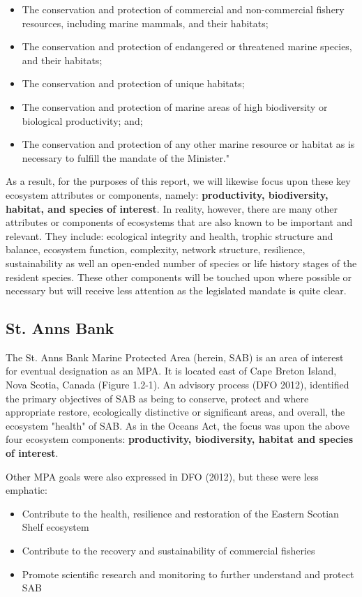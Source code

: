 \documentclass[letterpaper,portrait,11pt]{scrartcl}
\numberwithin{equation}{section}		%
\numberwithin{figure}{section}			%
\numberwithin{table}{section}				%
\begin{document}
\begin{itemize}
  \item The conservation and protection of commercial and non-commercial fishery resources, including marine mammals, and their habitats; 
  \item The conservation and protection of endangered or threatened marine species, and their habitats; 
  \item The conservation and protection of unique habitats; 
  \item The conservation and protection of marine areas of high biodiversity or biological productivity; and; 
  \item The conservation and protection of any other marine resource or habitat as is necessary to fulfill the mandate of the Minister."
\end{itemize}

As a result, for the purposes of this report, we will likewise focus upon these key ecosystem attributes or components, namely: \textbf{productivity, biodiversity, habitat, and  species of interest}. In reality, however, there are many other attributes or components of ecosystems that are also known to be important and relevant. They include: ecological integrity and health, trophic structure and balance, ecosystem function, complexity, network structure, resilience, sustainability as well an open-ended number of species or life history stages of the resident species. These other components will be touched upon where possible or necessary but will receive less attention as the legislated mandate is quite clear. 

\subsection{St. Anns Bank}
The St. Anns Bank Marine Protected Area (herein, SAB) is an area of interest for eventual designation as an MPA. It is located east of Cape Breton Island, Nova Scotia, Canada (Figure 1.2-1). An advisory process (DFO 2012), identified the primary objectives of SAB as being to conserve, protect and where appropriate restore, ecologically distinctive or significant areas, and overall, the ecosystem "health" of SAB. As in the Oceans Act, the focus was upon the above four ecosystem components: \textbf{productivity, biodiversity, habitat and species of interest}.

Other MPA goals were also expressed in DFO (2012), but these were less emphatic:

\begin{itemize}
	\item Contribute to the health, resilience and restoration of the Eastern Scotian Shelf ecosystem
	\item Contribute to the recovery and sustainability of commercial fisheries 
	\item Promote scientific research and monitoring to further understand and protect SAB
\end{itemize}
\end{document}
